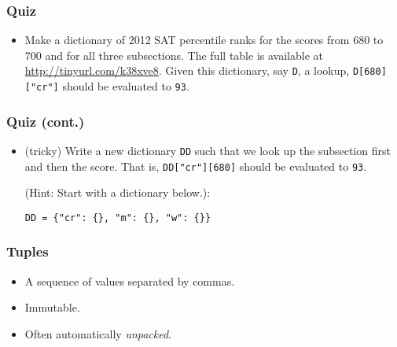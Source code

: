 \documentclass{beamer}
\begin{document}
\begin{frame}[fragile]
\frametitle{Quiz}
\begin{itemize}
\item<1-> Make a dictionary of 2012
      SAT percentile ranks for the scores
      from 680 to 700 and for all three subsections.
      The full table is available at 
      \url{http://tinyurl.com/k38xve8}.
      Given this dictionary, say \lstinline{D},
      a lookup, \lstinline{D[680]["cr"]}
      should be evaluated to \lstinline{93}.
% 
\end{itemize}
\end{frame}

\begin{frame}[fragile]
\frametitle{Quiz (cont.)}
\begin{itemize}
\item (tricky) Write a new dictionary \lstinline{DD} such that
     we look up the subsection first and then
     the score. That is,
     \lstinline{DD["cr"][680]} should be
     evaluated to \lstinline{93}.
 
     (Hint: Start with a dictionary below.):
\begin{lstlisting}
DD = {"cr": {}, "m": {}, "w": {}}
\end{lstlisting} 
\end{itemize}
\end{frame}

\begin{frame}[fragile]
\frametitle{Tuples}
\begin{itemize}
\item A sequence of values separated by commas.
\item Immutable.
\item Often automatically \emph{unpacked}.
\end{itemize}
\end{frame}
\end{document}

